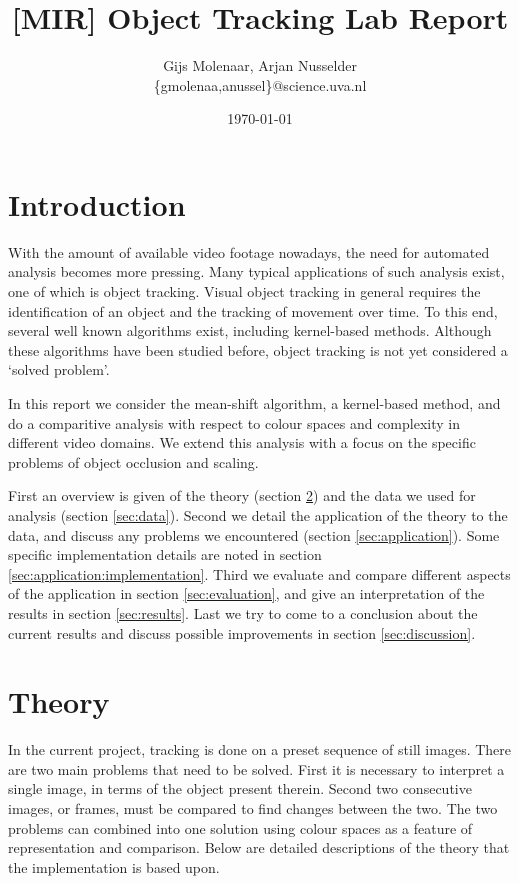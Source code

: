 \documentclass[a4paper,11pt]{article}
\title{[MIR] Object Tracking Lab Report}
\author{Gijs Molenaar, Arjan Nusselder\\
\{gmolenaa,anussel\}@science.uva.nl}
\date{\today}
\begin{document}
\maketitle



\section{Introduction}
\label{sec:introduction}
With the amount of available video footage nowadays, the need for automated analysis becomes more pressing.
Many typical applications of such analysis exist, one of which is object tracking.
Visual object tracking in general requires the identification of an object and the tracking of movement over time.
To this end, several well known algorithms exist, including kernel-based methods.
Although these algorithms have been studied before, object tracking is not yet considered a `solved problem'.

In this report we consider the mean-shift algorithm, a kernel-based method, and do a comparitive analysis with respect to colour spaces and complexity in different video domains.
We extend this analysis with a focus on the specific problems of object occlusion and scaling.

First an overview is given of the theory (section \ref{sec:theory}) and the data we used for analysis (section \ref{sec:data}).
Second we detail the application of the theory to the data, and discuss any problems we encountered (section \ref{sec:application}).
Some specific implementation details are noted in section \ref{sec:application:implementation}.
Third we evaluate and compare different aspects of the application in section \ref{sec:evaluation}, and give an interpretation of the results in section \ref{sec:results}.
Last we try to come to a conclusion about the current results and discuss possible improvements in section \ref{sec:discussion}.


\section{Theory}
\label{sec:theory}
In the current project, tracking is done on a preset sequence of still images.
There are two main problems that need to be solved.
First it is necessary to interpret a single image, in terms of the object present therein.
Second two consecutive images, or frames, must be compared to find changes between the two.
The two problems can combined into one solution using colour spaces as a feature of representation and comparison.
Below are detailed descriptions of the theory that the implementation is based upon.
\end{document}
